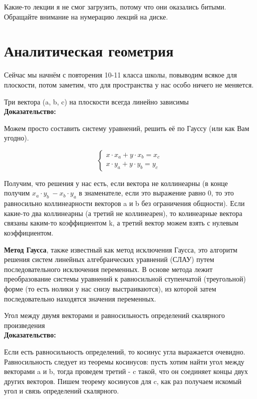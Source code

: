 \documentclass[12pt]{article}
\begin{document}
\begin{remarkbox}
     Какие-то лекции я не смог загрузить, потому что они оказались битыми. Обращайте внимание на нумерацию лекций на диске.
\end{remarkbox}

\section{Аналитическая геометрия}

Сейчас мы начнём с повторения 10-11 класса школы, повыводим всякое для плоскости, потом заметим, что для пространства у нас особо ничего не меняется.\\

\begin{theorembox}
Три вектора (a, b, c) на плоскости всегда линейно зависимы\\

\textbf{Доказательство:}

Можем просто составить систему уравнений, решить её по Гауссу (или как Вам угодно).

\[
\begin{cases}
x \cdot x_a + y \cdot x_b = x_c \\
x \cdot y_a + y \cdot y_b = y_c
\end{cases}
\]

Получим, что решения у нас есть, если вектора не коллинеарны (в конце получим $x_a \cdot y_b \ - x_b \cdot y_a$ в знаменателе, если это выражение равно 0, то это равносильно коллинеарности векторов a и b без ограничения общности). Если какие-то два коллинеарны (а третий не коллинеарен), то колинеарные вектора связаны каким-то коэффициентом k, а третий вектор можем взять с нулевым коэффициентом.
\end{theorembox}

\begin{definitionbox}
    \textbf{Метод Гаусса}, также известный как метод исключения Гаусса, это алгоритм решения систем линейных алгебраических уравнений (СЛАУ) путем последовательного исключения переменных. В основе метода лежит преобразование системы уравнений к равносильной ступенчатой (треугольной) форме (то есть нолики у нас снизу выстраиваются), из которой затем последовательно находятся значения переменных. 
\end{definitionbox}

\begin{theorembox}
Угол между двумя векторами и равносильность определений скалярного произведения\\

\textbf{Доказательство:}

Если есть равносильность определений, то косинус угла выражается очевидно. Равносильность следует из теоремы косинусов: пусть хотим найти угол между векторами a и b, тогда проведем третий - c такой, что он соединяет концы двух других векторов. Пишем теорему косинусов для c, как раз получаем искомый угол и связь определений скалярного.
\end{theorembox}
\end{document}
